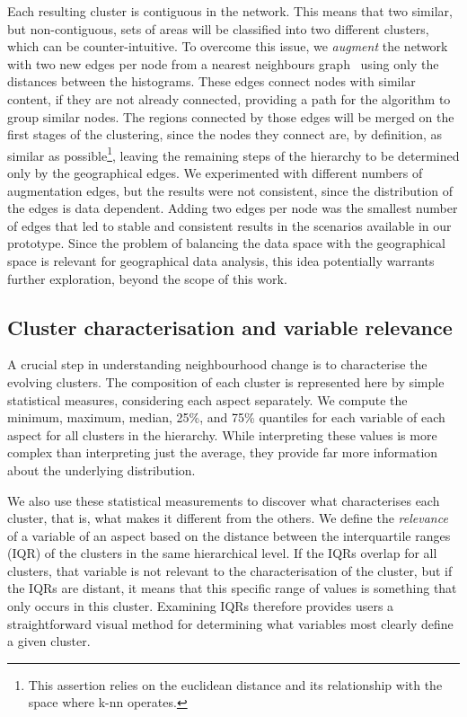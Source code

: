 Each resulting cluster is contiguous in the network. This means that two
similar, but non-contiguous, sets of areas will be classified into two different
clusters, which can be counter-intuitive. To overcome this issue, we
\emph{augment} the network with two new edges per node from a nearest neighbours
graph~\citep{scikit-learn} using only the distances between the histograms.
These edges connect nodes with similar content, if they are not already
connected, providing a path for the algorithm to group similar nodes. The
regions connected by those edges will be merged on the first stages of the
clustering, since the nodes they connect are, by definition, as similar as
possible\footnote{This assertion relies on the euclidean distance and its
relationship with the space where k-nn operates.}, leaving the remaining steps
of the hierarchy to be determined only by the geographical edges. We
experimented with different numbers of augmentation edges, but the results were
not consistent, since the distribution of the edges is data dependent. Adding
two edges per node was the smallest number of edges that led to stable and
consistent results in the scenarios available in our prototype. Since the
problem of balancing the data space with the geographical space is relevant for
geographical data analysis, this idea potentially warrants further exploration,
beyond the scope of this work.


\subsection{Cluster characterisation and variable relevance}
\label{sec:relevance}
A crucial step in understanding neighbourhood change is to characterise the
evolving clusters.  The composition of each cluster is represented here by
simple statistical measures, considering each aspect separately. We compute the
minimum, maximum, median, 25\%, and 75\% quantiles for each variable of each
aspect for all clusters in the hierarchy. While interpreting these values is
more complex than interpreting just the average, they provide far more
information about the underlying distribution.


We also use these statistical measurements to discover what characterises each
cluster, that is, what makes it different from the others.  We define the
\emph{relevance} of a variable of an aspect based on the distance between the
interquartile ranges (IQR) of the clusters in the same hierarchical level. If
the IQRs overlap for all clusters, that variable is not relevant to the
characterisation of the cluster, but if the IQRs are distant, it means that this
specific range of values is something that only occurs in this cluster.
Examining IQRs therefore provides users a straightforward visual method for
determining what variables most clearly define a given cluster.

